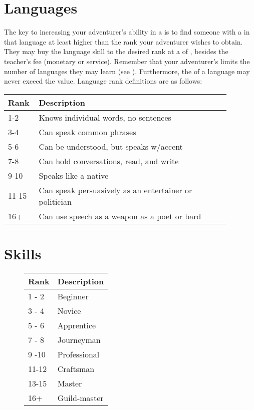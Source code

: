 \begin{multicols*}{2}
\section{Languages}
The key to increasing your adventurer's ability in a  is to find someone with a  in that language at least  higher than the rank your adventurer wishes to obtain. They may buy the language skill to the desired rank at a  of , besides the teacher's fee (monetary or service). Remember that your adventurer's \INT limits the number of languages they may learn (see ). Furthermore, the  of a language may never exceed the \INT value. Language rank definitions are as follows:

\begin{normboxc}
\small
\begin{tabular}{@{}p{0.085\linewidth} p{0.8\linewidth}}
\textbf{Rank} & \textbf{Description}\\
\midrule
1-2  & Knows individual words, no sentences\\
3-4  & Can speak common phrases\\
5-6  & Can be understood, but speaks w/accent\\
7-8  & Can hold conversations, read, and write\\
9-10  & Speaks like a native\\
11-15  & Can speak persuasively as an entertainer or politician\\
16+ & Can use speech as a weapon as a poet or bard
\end{tabular}
\end{normboxc}

\section{Skills}
\begin{wrapfigure}[9]{o}[0pt]{90pt}
\begin{normbox}
\small
\begin{tabular}{@{}l l}
\textbf{Rank} & \textbf{Description}\\
\midrule
1 - 2 & Beginner\\
3 - 4 & Novice\\
5 - 6 & Apprentice\\
7 - 8 & Journeyman\\
9 -10 & Professional\\
11-12 & Craftsman\\
13-15 & Master\\
16+ & Guild-master\\
\end{tabular}
\end{normbox}
\end{wrapfigure}


\end{multicols*}
